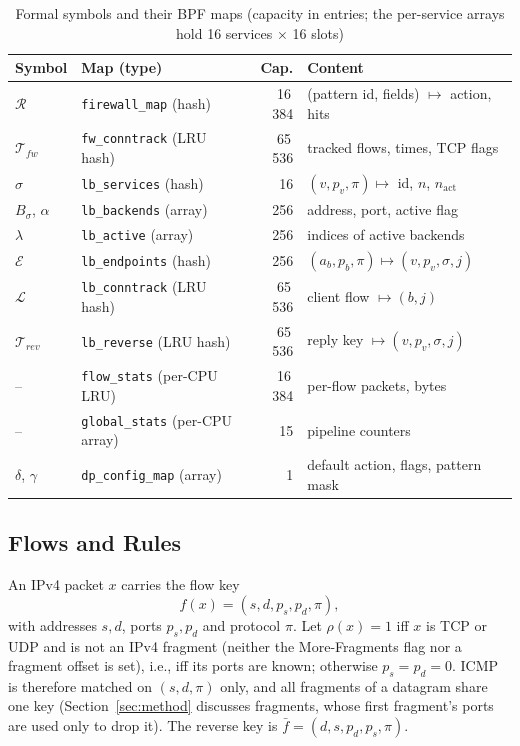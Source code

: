 \documentclass[conference]{IEEEtran}
\begin{document}
\begin{table}[t]
\caption{Formal symbols and their BPF maps (capacity in entries; the
per-service arrays hold 16 services $\times$ 16 slots)}
\label{tab:maps}
\centering\scriptsize
\setlength{\tabcolsep}{2.5pt}
\begin{tabular}{@{}llrl@{}}
\toprule
Symbol & Map (type) & Cap. & Content \\
\midrule
$\mathcal{R}$ & \texttt{firewall\_map} (hash) & 16\,384 & (pattern id, fields) $\mapsto$ action, hits \\
$\mathcal{T}_{fw}$ & \texttt{fw\_conntrack} (LRU hash) & 65\,536 & tracked flows, times, TCP flags \\
$\sigma$ & \texttt{lb\_services} (hash) & 16 & $(v,p_v,\pi) \mapsto$ id, $n$, $n_{\mathrm{act}}$ \\
$B_\sigma$, $\alpha$ & \texttt{lb\_backends} (array) & 256 & address, port, active flag \\
$\lambda$ & \texttt{lb\_active} (array) & 256 & indices of active backends \\
$\mathcal{E}$ & \texttt{lb\_endpoints} (hash) & 256 & $(a_b,p_b,\pi) \mapsto (v,p_v,\sigma,j)$ \\
$\mathcal{L}$ & \texttt{lb\_conntrack} (LRU hash) & 65\,536 & client flow $\mapsto (b,j)$ \\
$\mathcal{T}_{rev}$ & \texttt{lb\_reverse} (LRU hash) & 65\,536 & reply key $\mapsto (v,p_v,\sigma,j)$ \\
-- & \texttt{flow\_stats} (per-CPU LRU) & 16\,384 & per-flow packets, bytes \\
-- & \texttt{global\_stats} (per-CPU array) & 15 & pipeline counters \\
$\delta$, $\gamma$ & \texttt{dp\_config\_map} (array) & 1 & default action, flags, pattern mask \\
\bottomrule
\end{tabular}
\end{table}

\subsection{Flows and Rules}
\label{sec:rules}
An IPv4 packet $x$ carries the flow key
\begin{equation}
f(x) = (s, d, p_s, p_d, \pi),
\end{equation}
with addresses $s,d$, ports $p_s,p_d$ and protocol $\pi$. Let $\rho(x)=1$ iff
$x$ is TCP or UDP and is not an IPv4 fragment (neither the More-Fragments flag
nor a fragment offset is set), i.e., iff its ports are known; otherwise
$p_s=p_d=0$. ICMP is therefore matched on $(s,d,\pi)$ only, and all fragments
of a datagram share one key (Section~\ref{sec:method} discusses fragments,
whose first fragment's ports are used only to drop it). The reverse key is $\bar f = (d, s, p_d, p_s,
\pi)$.
\end{document}
